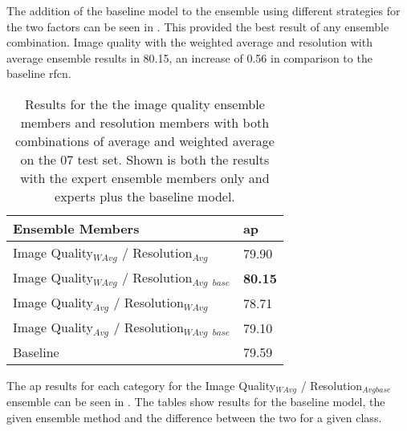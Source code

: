 \documentclass[a4paper,twoside]{article}
\begin{document}
The addition of the baseline model to the ensemble using different strategies for the two factors can be seen in . This provided the best result of any ensemble combination. Image quality with the weighted average and resolution with average ensemble results in 80.15, an increase of 0.56 in comparison to the baseline \gls{rfcn}.

\begin{table}[h]
\centering
\caption{Results for the the image quality ensemble members and resolution members with both combinations of average and weighted average on the 07 test set.  Shown is both the results with the expert ensemble members only and experts plus the baseline model.}
\label{tab:ensemble_comb_base}
\begin{tabular}{|l|l|}
\hline
\textbf{Ensemble Members}                  & \textbf{\gls{ap}} \\ \hline
Image Quality$_{WAvg}$ / Resolution$_{Avg}$  & 79.90 \\ \hline
Image Quality$_{WAvg}$ / Resolution$_{Avg}$ $_{base}$ & \textbf{80.15} \\ \hline
Image Quality$_{Avg}$ / Resolution$_{WAvg}$ & 78.71 \\ \hline
Image Quality$_{Avg}$ / Resolution$_{WAvg}$ $_{base}$ & 79.10 \\ \hline
Baseline                          & 79.59 \\ \hline
\end{tabular}
\end{table}


The \gls{ap} results for each category for the Image Quality$_{WAvg}$ / Resolution$_{Avgbase}$ ensemble can be seen in . The tables show results for the baseline model, the given ensemble method and the difference between the two for a given class. 
 
\end{document}
